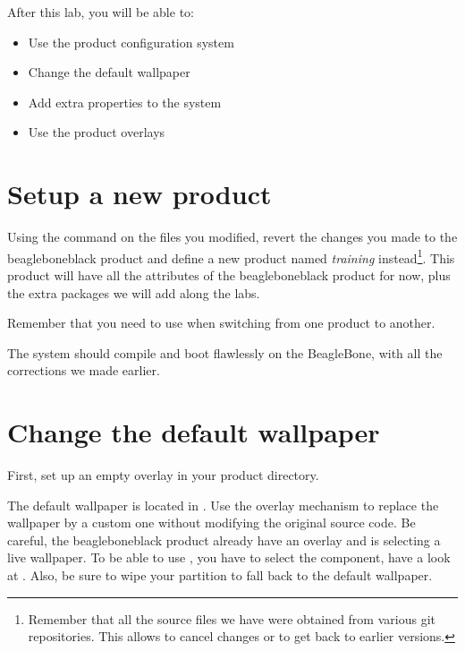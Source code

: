 
After this lab, you will be able to:
\begin{itemize}
  \item Use the product configuration system
  \item Change the default wallpaper
  \item Add extra properties to the system
  \item Use the product overlays
\end{itemize}

\section{Setup a new product}

Using the  command on the files you modified,
revert the changes you made to the beagleboneblack product and define
a new product named \textit{training} instead\footnote{Remember that
  all the source files we have were obtained from various git
  repositories. This allows to cancel changes or to get back to
  earlier versions.}.  This product will have all the attributes of
the beagleboneblack product for now, plus the extra packages we will
add along the labs.

Remember that you need to use  when switching
from one product to another.

The system should compile and boot flawlessly on the BeagleBone, with
all the corrections we made earlier.

\section{Change the default wallpaper}

First, set up an empty overlay in your product directory.

The default wallpaper is located in .
Use the overlay mechanism to replace the wallpaper by a custom one without
modifying the original source code. Be careful, the beagleboneblack
product already have an overlay and is selecting a live wallpaper. To
be able to use , you have to select the
 component, have a look at
.  Also, be sure
to wipe your  partition to fall back to the
default wallpaper.

